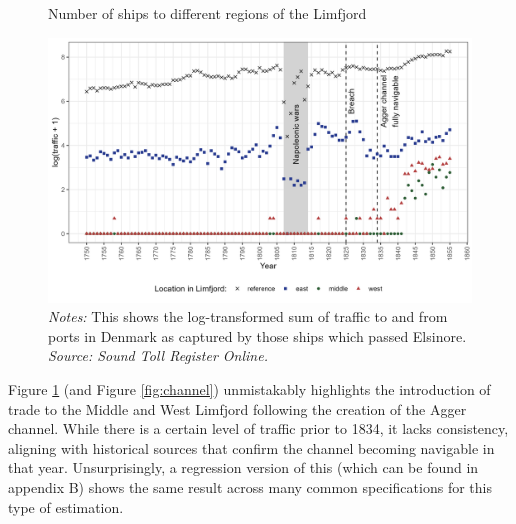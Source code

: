 \documentclass[11pt]{article}
\begin{document}
\begin{figure}[h]
\begin{center}
  \caption{\label{fig:Sound_toll} Number of ships to different regions of the Limfjord}
  \includegraphics[width=1\textwidth]{Plots/Ship_trafic.png}
  \parbox{0.9\textwidth}{
  \caption*{\footnotesize \textit{Notes:} This shows the log-transformed sum of traffic to and from ports in Denmark as captured by those ships which passed Elsinore. \\ \textit{Source: Sound Toll Register Online.}}
}
\end{center}
\end{figure}

Figure \ref{fig:Sound_toll} (and Figure \ref{fig:channel}) unmistakably highlights the introduction of trade to the Middle and West Limfjord following the creation of the Agger channel. While there is a certain level of traffic prior to 1834, it lacks consistency, aligning with historical sources that confirm the channel becoming navigable in that year. Unsurprisingly, a regression version of this (which can be found in appendix B) shows the same result across many common specifications for this type of estimation. 

\end{document}
